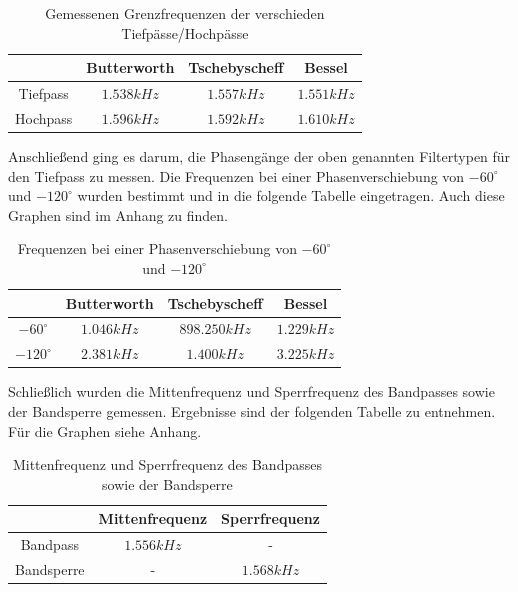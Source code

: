 	\begin{table}[h]
		\centering
		\begin{tabular}{c|c|c|c|}
					& Butterworth	& Tschebyscheff	& Bessel  \\
			\hline
			Tiefpass& $1.538kHz$	& $1.557kHz$	& $1.551kHz$  \\
			Hochpass& $1.596kHz$    & $1.592kHz$	& $1.610kHz$  \\   
		\end{tabular}
		\caption{Gemessenen Grenzfrequenzen der verschieden Tiefpässe/Hochpässe}
		\label{tab:grenzfrequnzen_hp_tp}
	\end{table}
	
\noindent Anschließend ging es darum, die Phasengänge der oben genannten Filtertypen für den Tiefpass zu messen. Die Frequenzen bei einer Phasenverschiebung von $-60^\circ$ und $-120^\circ$ wurden bestimmt und in die folgende Tabelle eingetragen. Auch diese Graphen sind im Anhang zu finden.

\begin{table}[h]
	\centering
		\begin{tabular}{c|c|c|c|}
						& Butterworth	& Tschebyscheff	& Bessel  \\
			\hline		
		    $-60^\circ $& $1.046kHz$    & $898.250kHz$	& $1.229kHz$  \\
			$-120^\circ$& $2.381kHz$    & $1.400kHz$	& $3.225kHz$  \\   
	\end{tabular}
	\caption{Frequenzen bei einer Phasenverschiebung von $-60^\circ$ und $-120^\circ$ }
	\label{tab:phasenverschiebung_hp_tp}
\end{table}
	
\noindent Schließlich wurden die Mittenfrequenz und Sperrfrequenz des Bandpasses sowie der Bandsperre gemessen. Ergebnisse sind der folgenden Tabelle zu entnehmen. Für die Graphen siehe Anhang.

\begin{table}[h]
	\centering
	\begin{tabular}{c|c|c|}
					& Mittenfrequenz & Sperrfrequenz  \\
		\hline
		Bandpass	& $1.556kHz$     & -         \\
		Bandsperre	& -              & $1.568kHz$  \\   
	\end{tabular}
	\caption{Mittenfrequenz und Sperrfrequenz des Bandpasses sowie der Bandsperre}
	\label{tab:grenzfrequnzen_bs_bp}
\end{table}

